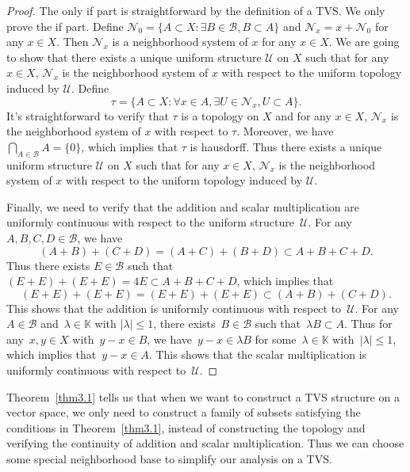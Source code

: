\documentclass[12pt,a4paper,draft]{article}  %
\theoremstyle{definition}
\numberwithin{equation}{section}
\begin{document}
\begin{proof}
    The only if part is straightforward by the definition of a TVS.
    We only prove the if part.
    Define $\mathcal{N}_0 = \{A \subset X: \exists B \in \mathcal{B}, B \subset A\}$ and $\mathcal{N}_x = x + \mathcal{N}_0$ for any $x \in X$.
    Then $\mathcal{N}_x$ is a neighborhood system of $x$ for any $x \in X$.
    We are going to show that there exists a unique uniform structure $\mathcal{U}$ on $X$ such that for any $x \in X$, $\mathcal{N}_x$ is the neighborhood system of $x$ with respect to the uniform topology induced by $\mathcal{U}$.
    Define
    $$ \tau = \{A \subset X: \forall x \in A, \exists U \in \mathcal{N}_x, U \subset A\}. $$
    It's straightforward to verify that $\tau$ is a topology on $X$ and for any $x \in X$, $\mathcal{N}_x$ is the neighborhood system of $x$ with respect to $\tau$.
    Moreover, we have $\bigcap_{A \in \mathcal{B}} A = \{0\}$, which implies that $\tau$ is hausdorff.
    Thus there exists a unique uniform structure $\mathcal{U}$ on $X$ such that for any $x \in X$, $\mathcal{N}_x$ is the neighborhood system of $x$ with respect to the uniform topology induced by $\mathcal{U}$.

    Finally, we need to verify that the addition and scalar multiplication are uniformly continuous with respect to the uniform structure~$\mathcal{U}$.
    For any~$A,B,C,D \in \mathcal{B}$, we have
    $$ (A+B) + (C+D) = (A+C) + (B+D) \subset A+B+C+D. $$
    Thus there exists $E \in \mathcal{B}$ such that $(E+E)+(E+E) = 4E \subset A+B+C+D$, which implies that
    $$ (E+E) + (E+E) = (E+E) + (E+E) \subset (A+B) + (C+D). $$
    This shows that the addition is uniformly continuous with respect to~$\mathcal{U}$.
    For any~$A \in \mathcal{B}$ and~$\lambda \in \mathbb{K}$ with $|\lambda| \leq 1$, there exists~$B \in \mathcal{B}$ such that~$\lambda B \subset A$.
    Thus for any~$x,y \in X$ with~$y-x \in B$,
    we have~$y-x \in \lambda B$ for some~$\lambda \in \mathbb{K}$ with~$|\lambda| \leq 1$, which implies that~$y-x \in A$.
    This shows that the scalar multiplication is uniformly continuous with respect to~$\mathcal{U}$.
\end{proof}
Theorem~\eqref{thm3.1} tells us that when we want to construct a TVS structure on a vector space, we only need to construct a family of subsets satisfying the conditions in Theorem~\eqref{thm3.1},
instead of constructing the topology and verifying the continuity of addition and scalar multiplication.
Thus we can choose some special neighborhood base to simplify our analysis on a TVS.
\end{document}
